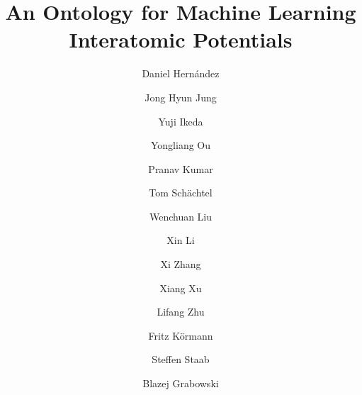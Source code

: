 \newcommand{\DanielHernandez}[1]{\todo[color=dhcolor!20,linecolor=dhcolor]{\textsf{Daniel: #1}}}
\newcommand{\JongHyunJung}[1]{\todo[color=jjcolor!20,linecolor=jjcolor]{\textsf{Jong Hyun: #1}}}
\newcommand{\YujiIkeda}[1]{\todo[color=yicolor!20,linecolor=yicolor]{\textsf{Yuji: #1}}}
\newcommand{\YongliangOu}[1]{\todo[color=yocolor!20,linecolor=yocolor]{\textsf{Yongliang: #1}}}
\newcommand{\PranavKumar}[1]{\todo[color=pkcolor!20,linecolor=pkcolor]{\textsf{Pranav: #1}}}
\newcommand{\TomSchaechtel}[1]{\todo[color=tscolor!20,linecolor=tscolor]{\textsf{Tom: #1}}}
\newcommand{\WenchuanLiu}[1]{\todo[color=wlcolor!20,linecolor=wlcolor]{\textsf{Wenchuan: #1}}}
\newcommand{\XinLi}[1]{\todo[color=xlcolor!20,linecolor=xlcolor]{\textsf{Xin: #1}}}
\newcommand{\XiZhang}[1]{\todo[color=xzcolor!20,linecolor=xzcolor]{\textsf{Xi: #1}}}
\newcommand{\XiangXu}[1]{\todo[color=xxcolor!20,linecolor=xxcolor]{\textsf{Xiang: #1}}}
\newcommand{\LifangZhu}[1]{\todo[color=lzcolor!20,linecolor=lzcolor]{\textsf{Lifang: #1}}}
\newcommand{\FritzKoermann}[1]{\todo[color=fkcolor!20,linecolor=fkcolor]{\textsf{Fritz: #1}}}
\newcommand{\SteffenStaab}[1]{\todo[color=sscolor!20,linecolor=sscolor]{\textsf{Steffen: #1}}}
\newcommand{\BlazejGrabowski}[1]{\todo[color=bgcolor!20,linecolor=bgcolor]{\textsf{Blazej: #1}}}









\title{An Ontology for Machine Learning Interatomic Potentials}

\author{Daniel Hern\'andez \and
Jong Hyun Jung \and
Yuji Ikeda \and
Yongliang Ou \and
Pranav Kumar \and
Tom Sch{\"a}chtel \and
Wenchuan Liu \and
Xin Li \and
Xi Zhang \and
Xiang Xu \and
Lifang Zhu \and
Fritz K{\"o}rmann \and
Steffen Staab \and
Blazej Grabowski}

